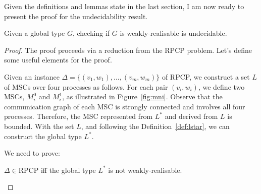 Given the definitions and lemmas state in the last section, I am now ready
to present the proof for the undecidability result.

\bigskip

\begin{theorem}\label{thm:main}
	Given a global type $G$, checking if $G$ is weakly-realisable is undecidable.
\end{theorem}

\begin{proof}
	The proof proceeds via a reduction from the RPCP problem. Let's define some useful
	elements for the proof.

	Given an instance $\Delta = \{(v_1, w_1), \ldots, (v_m, w_m)\}$ of RPCP, we
	construct a set $L$ of MSCs over four processes as follows. For each pair
	$(v_i, w_i)$, we define two MSCs, $M^0_i$ and $M^1_i$, as illustrated in
	Figure~\ref{fig:mni}.
	Observe that the communication graph of each MSC is strongly connected and
	involves all four processes. Therefore, the MSC represented from
	$L^*$ and derived from $L$ is bounded.
	With the set $L$, and following the Definition~\ref{def:lstar},
	we can construct the global type $L^*$.

	We need to prove:
	\begin{center}
		$\Delta \in \text{RPCP}$ iff the global type $L^*$ is not weakly-realisable.
	\end{center}


\end{proof}
